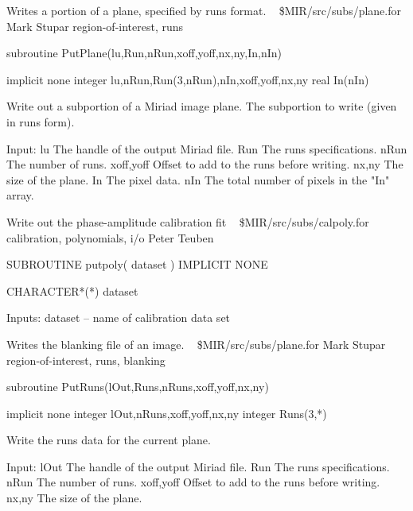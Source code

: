 %
\noindent Writes a portion of a plane, specified by runs format.
\newline \ 
\newline {} \$MIR/src/subs/plane.for
\newline {} Mark Stupar
\newline {} region-of-interest, runs
\par{\tenpoint
{\eightpoint\begintt
        subroutine PutPlane(lu,Run,nRun,xoff,yoff,nx,ny,In,nIn)

        implicit none
        integer lu,nRun,Run(3,nRun),nIn,xoff,yoff,nx,ny
        real In(nIn)

  Write out a subportion of a Miriad image plane. The subportion to
  write  (given in runs form).

  Input:
    lu         The handle of the output Miriad file.
    Run        The runs specifications.
    nRun       The number of runs.
    xoff,yoff  Offset to add to the runs before writing.
    nx,ny      The size of the plane.
    In         The pixel data.
    nIn        The total number of pixels in the "In" array.
\endtt}
\par}
%
\noindent Write out the phase-amplitude calibration fit
\newline \ 
\newline {} \$MIR/src/subs/calpoly.for
\newline {} calibration, polynomials, i/o
\newline \abox{Responsible:} Peter Teuben
\par{\tenpoint
{\eightpoint\begintt
        SUBROUTINE putpoly( dataset )
        IMPLICIT NONE

        CHARACTER*(*) dataset

  Inputs:
       dataset -- name of calibration data set
\endtt}
\par}
%
\noindent Writes the blanking file of an image.
\newline \ 
\newline {} \$MIR/src/subs/plane.for
\newline \abox{Responsible:} Mark Stupar
\newline {} region-of-interest, runs, blanking
\par{\tenpoint
{\eightpoint\begintt
        subroutine PutRuns(lOut,Runs,nRuns,xoff,yoff,nx,ny)

        implicit none
        integer lOut,nRuns,xoff,yoff,nx,ny
        integer Runs(3,*)

  Write the runs data for the current plane.

  Input:
    lOut       The handle of the output Miriad file.
    Run        The runs specifications.
    nRun       The number of runs.
    xoff,yoff  Offset to add to the runs before writing.
    nx,ny      The size of the plane.
\endtt}
\par}
